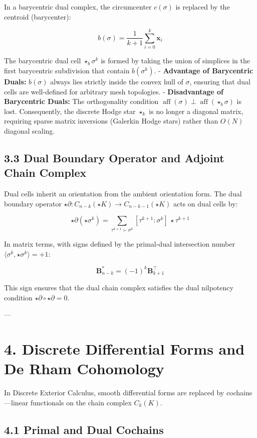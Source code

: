 \documentclass[11pt,twoside,openright]{amsbook}
\begin{document}
In a barycentric dual complex, the circumcenter $c(\sigma)$ is replaced by the centroid (barycenter):

$$b(\sigma) = \frac{1}{k+1} \sum_{i=0}^k \mathbf{x}_i$$

The barycentric dual cell $\star_b \sigma^k$ is formed by taking the union of simplices in the first barycentric subdivision that contain $b(\sigma^k)$.
- \textbf{Advantage of Barycentric Duals:} $b(\sigma)$ always lies strictly inside the convex hull of $\sigma$, ensuring that dual cells are well-defined for arbitrary mesh topologies.
- \textbf{Disadvantage of Barycentric Duals:} The orthogonality condition $\operatorname{aff}(\sigma) \perp \operatorname{aff}(\star_b \sigma)$ is lost. Consequently, the discrete Hodge star $\star_k$ is no longer a diagonal matrix, requiring sparse matrix inversions (Galerkin Hodge stars) rather than $O(N)$ diagonal scaling.

\subsection{3.3 Dual Boundary Operator and Adjoint Chain Complex}

Dual cells inherit an orientation from the ambient orientation form. The dual boundary operator $\star \partial : C_{n-k}(\star K) \to C_{n-k-1}(\star K)$ acts on dual cells by:

$$\star \partial (\star \sigma^k) = \sum_{\tau^{k+1} \succ \sigma^k} [\tau^{k+1} : \sigma^k] \, \star \tau^{k+1}$$

In matrix terms, with signs defined by the primal-dual intersection number $\langle \sigma^k, \star \sigma^k \rangle = +1$:

$$\mathbf{B}_{n-k}^* = (-1)^k \mathbf{B}_{k+1}^\top$$

This sign ensures that the dual chain complex satisfies the dual nilpotency condition $\star \partial \circ \star \partial = 0$.

---

\section{4. Discrete Differential Forms and De Rham Cohomology}

In Discrete Exterior Calculus, smooth differential forms are replaced by cochains—linear functionals on the chain complex $C_k(K)$.

\subsection{4.1 Primal and Dual Cochains}
\end{document}
